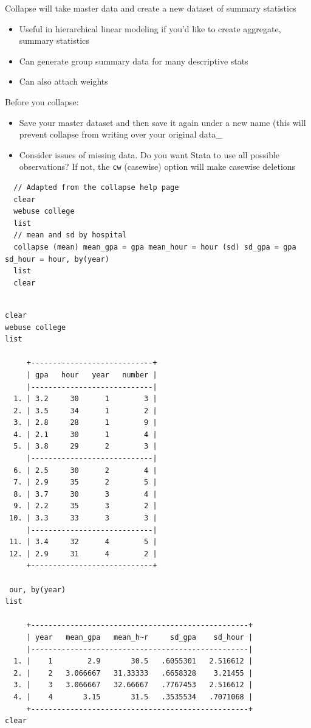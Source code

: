 \documentclass[]{book}
\providecommand{\tightlist}{%
  \setlength{\itemsep}{0pt}\setlength{\parskip}{0pt}}
\begin{document}
Collapse will take master data and create a new dataset of summary statistics

\begin{itemize}
\tightlist
\item
  Useful in hierarchical linear modeling if you'd like to create aggregate, summary statistics
\item
  Can generate group summary data for many descriptive stats
\item
  Can also attach weights
\end{itemize}

Before you collapse:

\begin{itemize}
\tightlist
\item
  Save your master dataset and then save it again under a new name (this will prevent collapse from writing over your original data\_
\item
  Consider issues of missing data. Do you want Stata to use all possible observations? If not, the \texttt{cw} (casewise) option will make casewise deletions
\end{itemize}

\begin{verbatim}
  // Adapted from the collapse help page
  clear
  webuse college
  list
  // mean and sd by hospital
  collapse (mean) mean_gpa = gpa mean_hour = hour (sd) sd_gpa = gpa sd_hour = hour, by(year)
  list
  clear
\end{verbatim}

\begin{verbatim}

clear
webuse college
list

     +----------------------------+
     | gpa   hour   year   number |
     |----------------------------|
  1. | 3.2     30      1        3 |
  2. | 3.5     34      1        2 |
  3. | 2.8     28      1        9 |
  4. | 2.1     30      1        4 |
  5. | 3.8     29      2        3 |
     |----------------------------|
  6. | 2.5     30      2        4 |
  7. | 2.9     35      2        5 |
  8. | 3.7     30      3        4 |
  9. | 2.2     35      3        2 |
 10. | 3.3     33      3        3 |
     |----------------------------|
 11. | 3.4     32      4        5 |
 12. | 2.9     31      4        2 |
     +----------------------------+

 our, by(year)
list

     +--------------------------------------------------+
     | year   mean_gpa   mean_h~r     sd_gpa    sd_hour |
     |--------------------------------------------------|
  1. |    1        2.9       30.5   .6055301   2.516612 |
  2. |    2   3.066667   31.33333   .6658328    3.21455 |
  3. |    3   3.066667   32.66667   .7767453   2.516612 |
  4. |    4       3.15       31.5   .3535534   .7071068 |
     +--------------------------------------------------+
clear
\end{verbatim}
\end{document}
